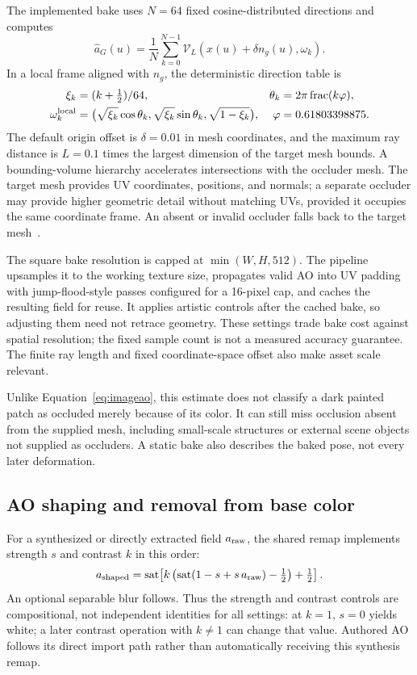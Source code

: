\documentclass[11pt,letterpaper]{article}
\newcommand{\sat}{\operatorname{sat}}
\begin{document}
The implemented bake uses $N=64$ fixed cosine-distributed directions and computes
\begin{equation}
\widehat a_G(u)=\frac{1}{N}\sum_{k=0}^{N-1}
 \mathcal V_L(x(u)+\delta n_g(u),\omega_k).
\label{eq:aobake}
\end{equation}
In a local frame aligned with $n_g$, the deterministic direction table is
\begin{align}
\xi_k&=(k+\tfrac12)/64, & \theta_k&=2\pi\operatorname{frac}(k\varphi),\\
\omega_k^{\rm local}&=\bigl(\sqrt{\xi_k}\cos\theta_k,
 \sqrt{\xi_k}\sin\theta_k,\sqrt{1-\xi_k}\bigr),
 &\varphi&=0.61803398875.
\end{align}
The default origin offset is $\delta=0.01$ in mesh coordinates, and the maximum ray distance is $L=0.1$ times the largest dimension of the target mesh bounds. A bounding-volume hierarchy accelerates intersections with the occluder mesh. The target mesh provides UV coordinates, positions, and normals; a separate occluder may provide higher geometric detail without matching UVs, provided it occupies the same coordinate frame. An absent or invalid occluder falls back to the target mesh~\cite{namer2026}.

The square bake resolution is capped at $\min(W,H,512)$. The pipeline upsamples it to the working texture size, propagates valid AO into UV padding with jump-flood-style passes configured for a 16-pixel cap, and caches the resulting field for reuse. It applies artistic controls after the cached bake, so adjusting them need not retrace geometry. These settings trade bake cost against spatial resolution; the fixed sample count is not a measured accuracy guarantee. The finite ray length and fixed coordinate-space offset also make asset scale relevant.

Unlike Equation~\eqref{eq:imageao}, this estimate does not classify a dark painted patch as occluded merely because of its color. It can still miss occlusion absent from the supplied mesh, including small-scale structures or external scene objects not supplied as occluders. A static bake also describes the baked pose, not every later deformation.

\subsection{AO shaping and removal from base color}
For a synthesized or directly extracted field $a_{\rm raw}$, the shared remap implements strength $s$ and contrast $k$ in this order:
\begin{equation}
a_{\rm shaped}=\sat\!\left[
 k\left(\sat(1-s+s\,a_{\rm raw})-\tfrac12\right)+\tfrac12
\right].
\label{eq:aoremap}
\end{equation}
An optional separable blur follows. Thus the strength and contrast controls are compositional, not independent identities for all settings: at $k=1$, $s=0$ yields white; a later contrast operation with $k\ne1$ can change that value. Authored AO follows its direct import path rather than automatically receiving this synthesis remap.
\end{document}
